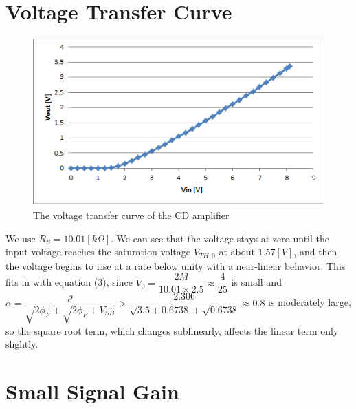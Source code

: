 \documentclass[a4paper, itemph]{oblivoir}
\theoremstyle{definition}
\begin{document}
\section{Voltage Transfer Curve}
\begin{figure}[htb]
    \centering
    \includegraphics{vtc_cd.png}
    \caption{The voltage transfer curve of the CD amplifier}
\end{figure}
We use $R_S=10.01[k\Omega]$. We can see that the voltage stays at zero until the input voltage reaches the saturation voltage $V_{TH,0}$ at about $1.57[V]$, and then the voltage begins to rise at a rate below unity with a near-linear behavior. This fits in with equation (3), since $V_0=\dfrac{2M}{10.01\times 2.5}\approx \dfrac{4}{25}$ is small and $\alpha=\dfrac{\rho}{\sqrt{2\phi_F}+\sqrt{2\phi_F+V_{SB}}}>\dfrac{2.306}{\sqrt{3.5+0.6738}+\sqrt{0.6738}}\approx 0.8$ is moderately large, so the square root term, which changes sublinearly, affects the linear term only slightly.
\section{Small Signal Gain}
\end{document}
